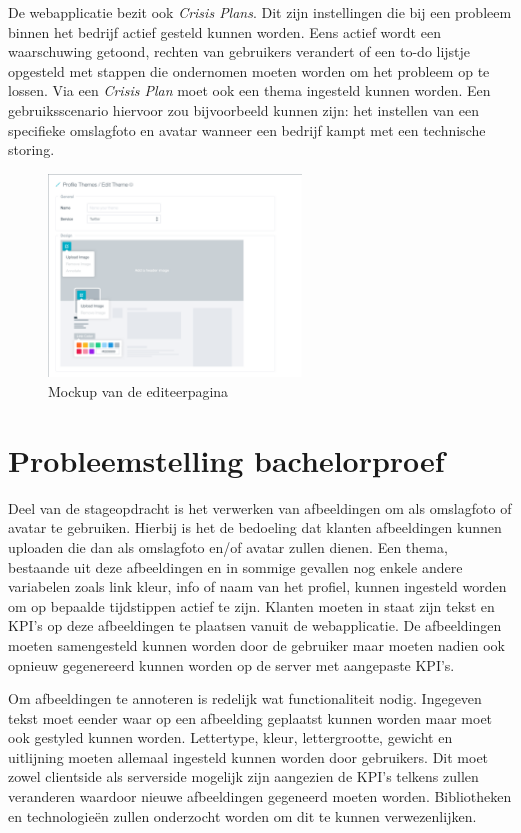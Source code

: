 De webapplicatie bezit ook \textit{Crisis Plans}. Dit zijn instellingen die bij een probleem binnen het bedrijf actief gesteld kunnen worden. Eens actief wordt een waarschuwing getoond, rechten van gebruikers verandert of een to-do lijstje opgesteld met stappen die ondernomen moeten worden om het probleem op te lossen. Via een \textit{Crisis Plan} moet ook een thema ingesteld kunnen worden. Een gebruiksscenario hiervoor zou bijvoorbeeld kunnen zijn: het instellen van een specifieke omslagfoto en avatar wanneer een bedrijf kampt met een technische storing. 

\begin{figure}[H]
	\centering
	\includegraphics[width=0.6\textwidth]{Figuren/EditThemeMockup.png}
	\caption{Mockup van de editeerpagina \cite{EditThemeMockup}} %
	\label{fig:EditTheme}
\end{figure} 

\section{Probleemstelling bachelorproef}

Deel van de stageopdracht is het verwerken van afbeeldingen om als omslagfoto of avatar te gebruiken. Hierbij is het de bedoeling dat klanten afbeeldingen kunnen uploaden die dan als omslagfoto en/of avatar zullen dienen. Een thema, bestaande uit deze afbeeldingen en in sommige gevallen nog enkele andere variabelen zoals link kleur, info of naam van het profiel, kunnen ingesteld worden om op bepaalde tijdstippen actief te zijn. Klanten moeten in staat zijn tekst en KPI's op deze afbeeldingen te plaatsen vanuit de webapplicatie. De afbeeldingen moeten samengesteld kunnen worden door de gebruiker maar moeten nadien ook opnieuw gegenereerd kunnen worden op de server met aangepaste KPI's. 

Om afbeeldingen te annoteren is redelijk wat functionaliteit nodig. Ingegeven tekst moet eender waar op een afbeelding geplaatst kunnen worden maar moet ook gestyled kunnen worden. Lettertype, kleur, lettergrootte, gewicht en uitlijning moeten allemaal ingesteld kunnen worden door gebruikers. Dit moet zowel clientside als serverside mogelijk zijn aangezien de KPI's telkens zullen veranderen waardoor nieuwe afbeeldingen gegeneerd moeten worden. Bibliotheken en technologie\"{e}n zullen onderzocht worden om dit te kunnen verwezenlijken.

